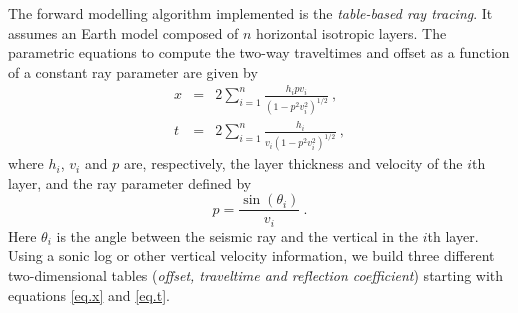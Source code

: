 \documentclass{vie16}
\begin{document}
The forward modelling algorithm implemented is the \textit{table-based
ray tracing}. It assumes an Earth model composed of $n$ horizontal
isotropic layers. The parametric equations to compute the two-way
traveltimes and offset as a function of a constant ray parameter are
given by \citep{Slotnick1959}
\begin{eqnarray} x & = & 2\sum_{i=1}^{n} \frac {h_{i}pv_{i}} {(1
		- p^{2}v_{i}^{2})^{1/2}} \ ,\label{eq.x} \\ t & = &
		2\sum_{i=1}^{n} \frac {h_{i}} {v_{i}(1 -
		p^{2}v_{i}^{2})^{1/2}} \ , \label{eq.t} \end{eqnarray}
%
where $h_{i}$, $v_{i}$ and $p$ are, respectively, the
layer thickness and velocity of the $i$th layer, and the ray parameter 
defined by
\begin{equation}
p = \frac{\sin(\theta_{i})}{v_{i}}\ .\label{eq.p}
\end{equation}
Here $\theta_i$ is the angle between the seismic ray and the
vertical in the $i$th layer. Using a sonic log or other
vertical velocity information, we build three different
two-dimensional tables (\textit{offset, traveltime and
reflection coefficient}) starting with equations
\ref{eq.x} and \ref{eq.t}.
\end{document}
